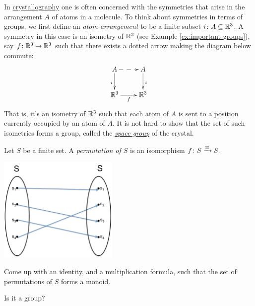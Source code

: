 \begin{exampleRUS}\label{ex:important groups}
\end{exampleRUS}

\begin{applicationENG}\label{app:groups for symmetry}
In \href{http://en.wikipedia.org/wiki/Crystallography}{\text crystallography} one is often concerned with the symmetries that arise in the arrangement $A$ of atoms in a molecule. To think about symmetries in terms of groups, we first define an {\em atom-arrangement} to be a finite subset $i\colon A\subseteq{\mathbb R}^3$. A symmetry in this case is an isometry of ${\mathbb R}^3$ (see Example \ref{ex:important groups}), say $f\colon{\mathbb R}^3\rightarrow{\mathbb R}^3$ such that there exists a dotted arrow making the diagram below commute:
$$
\xymatrix{A\ar@{-->}[r]\ar[d]_i&A\ar[d]^i\\\RR^3\ar[r]_f&\RR^3}
$$
That is, it's an isometry of ${\mathbb R}^3$ such that each atom of $A$ is sent to a position currently occupied by an atom of $A$. It is not hard to show that the set of such isometries forms a group, called the \href{http://en.wikipedia.org/wiki/Space_group}{\em space group} of the crystal.
\end{applicationENG}

\begin{applicationRUS}\label{app:groups for symmetry}
\end{applicationRUS}

\begin{exerciseENG}\label{exc:permutation}
Let $S$ be a finite set. A {\em permutation of $S$} is an isomorphism $f\colon S\xrightarrow{\cong}S$. 
\begin{center}
\parbox{2.3in}{
\includegraphics[height=2in]{SetPermutation}}
\end{center}
\sexc Come up with an identity, and a  multiplication formula, such that the set of permutations of $S$ forms a monoid. 
\item Is it a group?
\endsexc
\end{exerciseENG}

